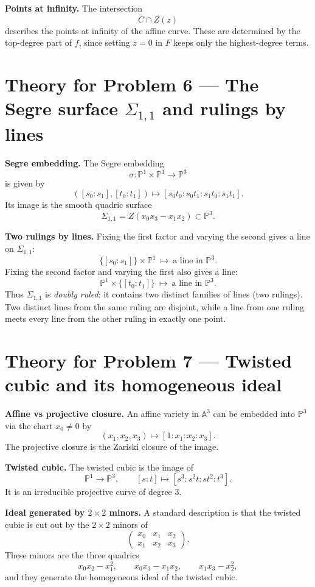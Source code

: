 \documentclass[12pt,a4paper]{article}
\theoremstyle{plain}
\theoremstyle{definition}      %
\begin{document}
\textbf{Points at infinity.}
The intersection
\[
\overline{C}\cap Z(z)
\]
describes the points at infinity of the affine curve.
These are determined by the top-degree part of $f$, since setting $z=0$ in $F$ keeps only the highest-degree terms.


\section*{Theory for Problem 6 — The Segre surface $\Sigma_{1,1}$ and rulings by lines}

\textbf{Segre embedding.}
The Segre embedding
\[
\sigma:\mathbb{P}^1\times \mathbb{P}^1\longrightarrow \mathbb{P}^3
\]
is given by
\[
([s_0:s_1],[t_0:t_1])
\longmapsto
[s_0t_0:s_0t_1:s_1t_0:s_1t_1].
\]
Its image is the smooth quadric surface
\[
\Sigma_{1,1}=Z(x_0x_3-x_1x_2)\subset \mathbb{P}^3.
\]

\textbf{Two rulings by lines.}
Fixing the first factor and varying the second gives a line on $\Sigma_{1,1}$:
\[
\{[s_0:s_1]\}\times \mathbb{P}^1\ \mapsto\ \text{a line in }\mathbb{P}^3.
\]
Fixing the second factor and varying the first also gives a line:
\[
\mathbb{P}^1\times \{[t_0:t_1]\}\ \mapsto\ \text{a line in }\mathbb{P}^3.
\]
Thus $\Sigma_{1,1}$ is \emph{doubly ruled}: it contains two distinct families of lines (two rulings).
Two distinct lines from the same ruling are disjoint, while a line from one ruling meets every line from the other ruling in exactly one point.


\section*{Theory for Problem 7 — Twisted cubic and its homogeneous ideal}

\textbf{Affine vs projective closure.}
An affine variety in $\mathbb{A}^3$ can be embedded into $\mathbb{P}^3$ via the chart $x_0\neq 0$ by
\[
(x_1,x_2,x_3)\longmapsto [1:x_1:x_2:x_3].
\]
The projective closure is the Zariski closure of the image.

\textbf{Twisted cubic.}
The twisted cubic is the image of
\[
\mathbb{P}^1\to \mathbb{P}^3,
\qquad
[s:t]\mapsto [s^3:s^2t:st^2:t^3].
\]
It is an irreducible projective curve of degree $3$.

\textbf{Ideal generated by $2\times 2$ minors.}
A standard description is that the twisted cubic is cut out by the $2\times 2$ minors of
\[
\begin{pmatrix}
	x_0 & x_1 & x_2\\
	x_1 & x_2 & x_3
\end{pmatrix}.
\]
These minors are the three quadrics
\[
x_0x_2-x_1^2,
\qquad
x_0x_3-x_1x_2,
\qquad
x_1x_3-x_2^2,
\]
and they generate the homogeneous ideal of the twisted cubic.
\end{document}
